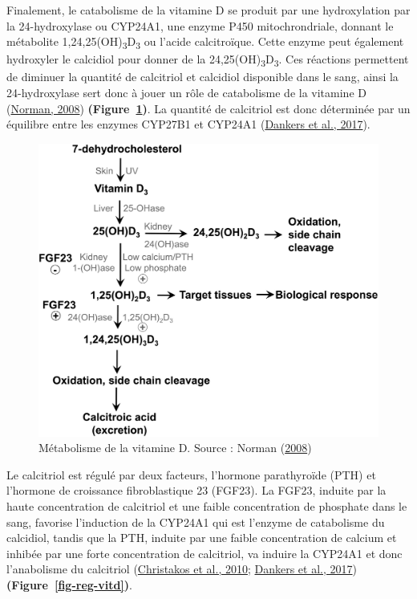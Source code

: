 \documentclass[
  a4paper,
  DIV=11,
  numbers=noendperiod,
  listof=totoc]{scrreprt}
\begin{document}
Finalement, le catabolisme de la vitamine D se produit par une
hydroxylation par la 24-hydroxylase ou CYP24A1, une enzyme P450
mitochrondriale, donnant le métabolite
1,24,25(OH)\textsubscript{3}D\textsubscript{3} ou l'acide calcitroïque.
Cette enzyme peut également hydroxyler le calcidiol pour donner de la
24,25(OH)\textsubscript{3}D\textsubscript{3}. Ces réactions permettent
de diminuer la quantité de calcitriol et calcidiol disponible dans le
sang, ainsi la 24-hydroxylase sert donc à jouer un rôle de catabolisme
de la vitamine D (\protect\hyperlink{ref-Norman.2008}{Norman, 2008})
\textbf{(Figure~\ref{fig-metabolism-vitd})}. La quantité de calcitriol
est donc déterminée par un équilibre entre les enzymes CYP27B1 et
CYP24A1 (\protect\hyperlink{ref-Dankers.2017}{Dankers et al., 2017}).

\begin{figure}

{\centering \includegraphics{figures/vitamin-d-metabolism.png}

}

\caption{\label{fig-metabolism-vitd}Métabolisme de la vitamine D. Source
: Norman (\protect\hyperlink{ref-Norman.2008}{2008})}

\end{figure}

Le calcitriol est régulé par deux facteurs, l'hormone parathyroïde (PTH)
et l'hormone de croissance fibroblastique 23 (FGF23). La FGF23, induite
par la haute concentration de calcitriol et une faible concentration de
phosphate dans le sang, favorise l'induction de la CYP24A1 qui est
l'enzyme de catabolisme du calcidiol, tandis que la PTH, induite par une
faible concentration de calcium et inhibée par une forte concentration
de calcitriol, va induire la CYP24A1 et donc l'anabolisme du calcitriol
(\protect\hyperlink{ref-Christakos.2010}{Christakos et al., 2010};
\protect\hyperlink{ref-Dankers.2017}{Dankers et al., 2017})
\textbf{(Figure~\ref{fig-reg-vitd})}.
\end{document}
